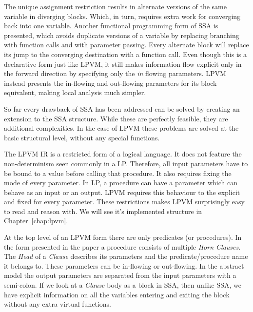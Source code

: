 The unique assignment restriction results in alternate versions of the same
variable in diverging blocks. Which, in turn, requires extra work for
converging back into one variable. Another functional programming form of SSA
\citep{appelfp} is presented, which avoids duplicate versions of a variable by
replacing branching with function calls and \phifs with parameter
passing. Every alternate block will replace its jump to the converging
destination with a function call. Even though this is a declarative form just
like LPVM, it still makes information flow explicit only in the forward
direction by specifying only the \textit{in} flowing parameters. LPVM instead
presents the in-flowing and out-flowing parameters for its block equivalent,
making local analysis much simpler.

So far every drawback of SSA has been addressed can be solved by creating an
extension to the SSA structure. While these are perfectly feasible, they are
additional complexities. In the case of LPVM these problems are solved at the
basic structural level, without any special functions.

The LPVM IR is a restricted form of a logical language. It does not feature the
non-determinism seen commonly in a LP. Therefore, all input parameters have to
be bound to a value before calling that procedure. It also requires fixing the
mode of every parameter. In LP, a procedure can have a parameter which can
behave as an input or an output. LPVM requires this behaviour to the explicit
and fixed for every parameter. These restrictions makes LPVM surprisingly easy
to read and reason with. We will see it's implemented structure in
Chapter~\ref{chap:lpvm}.

At the top level of an LPVM form there are only predicates (or procedures). In
the form presented in the paper a procedure consists of multiple \textit{Horn
  Clauses}. The \textit{Head} of a \textit{Clause} describes its parameters and
the predicate/procedure name it belongs to. These parameters can be in-flowing
or out-flowing. In the abstract model the output parameters are separated from
the input parameters with a semi-colon. If we look at a \textit{Clause} body as
a block in SSA, then unlike SSA, we have explicit information on all the
variables entering and exiting the block without any extra virtual functions.

